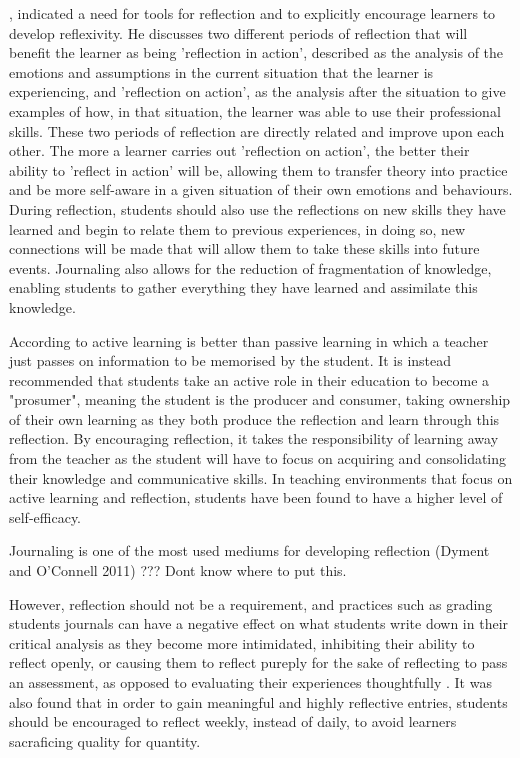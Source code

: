 \documentclass{l4proj}
\begin{document}
\citet{schon_reflective_1984}, indicated a need for tools for reflection and to explicitly encourage learners to develop reflexivity. He discusses two different
periods of reflection that will benefit the learner as being 'reflection in action', described as the analysis of the emotions and assumptions in the 
current situation that the learner is experiencing, and 'reflection on action', as the analysis after the situation to give examples of how, in that
situation, the learner was able to use their professional skills. 
These two periods of reflection are directly related and improve upon each other. The more a learner carries out 'reflection on action', the better their 
ability to 'reflect in action' will be, allowing them to transfer theory into practice and be more self-aware in a given situation of their own emotions 
and behaviours. During reflection, students should also use the reflections on new skills they have learned and begin to relate them to previous 
experiences, in doing so, new connections will be made that will allow them to take these skills into future events. Journaling also allows for the reduction
of fragmentation of knowledge, enabling students to gather everything they have learned and assimilate this knowledge.

According to \citet{bruno_reflective_2018} active learning is better than passive learning in which a teacher just passes on information to be 
memorised by the student. It is instead recommended that students take an active role in their education to become a "prosumer", meaning the student 
is the producer and consumer, taking ownership of their own learning as they both produce the reflection and learn through this reflection.
By encouraging reflection, it takes the responsibility of learning away from the teacher as the student will have to focus on acquiring and consolidating 
their knowledge and communicative skills. In teaching environments that focus on active learning and reflection, students have been found to have a 
higher level of self-efficacy.

Journaling is one of the most used mediums for developing reflection (Dyment and O'Connell 2011) ??? Dont know where to put this. 

However, reflection should not be a requirement, and practices such as grading students journals can have a negative effect on what students write down 
in their critical analysis as they become more intimidated, inhibiting their ability to reflect openly, or causing them to reflect pureply for the 
sake of reflecting to pass an assessment, as opposed to evaluating their experiences thoughtfully \citep{bruno_reflective_2018}. It was also found that
in order to gain meaningful and highly reflective entries, students should be encouraged to reflect weekly, instead of daily, to avoid learners sacraficing 
quality for quantity.
\end{document}
